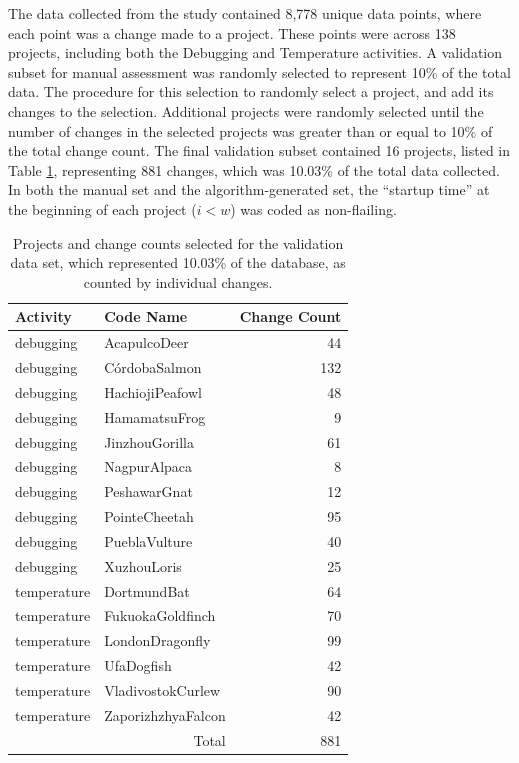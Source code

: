 The data collected from the study contained 8,778 unique data points, where each point was a change made to a project. These points were across 138 projects, including both the Debugging and Temperature activities. A validation subset for manual assessment was randomly selected to represent 10\% of the total data. The procedure for this selection to randomly select a project, and add its changes to the selection. Additional projects were randomly selected until the number of changes in the selected projects was greater than or equal to 10\% of the total change count. The final validation subset contained 16 projects, listed in Table \ref{tab:selected-projects}, representing 881 changes, which was 10.03\% of the total data collected. In both the manual set and the algorithm-generated set, the ``startup time'' at the beginning of each project ($i < w$) was coded as non-flailing.

\begin{table}
\begin{centering}
\begin{tabular}{l l r}
	Activity & Code Name & Change Count \\ \hline
	debugging & AcapulcoDeer & 44\\
	debugging & CórdobaSalmon & 132\\
	debugging & HachiojiPeafowl & 48\\
	debugging & HamamatsuFrog & 9\\
	debugging & JinzhouGorilla & 61\\
	debugging & NagpurAlpaca & 8\\
	debugging & PeshawarGnat & 12\\
	debugging & PointeCheetah & 95\\
	debugging & PueblaVulture & 40\\
	debugging & XuzhouLoris & 25 \\
	temperature & DortmundBat & 64\\
	temperature & FukuokaGoldfinch & 70 \\
	temperature & LondonDragonfly & 99 \\
	temperature & UfaDogfish & 42\\
	temperature & VladivostokCurlew & 90 \\
	temperature & ZaporizhzhyaFalcon & 42 \\ \hline
	\multicolumn{2}{r}{Total} & 881
\end{tabular}
\caption[Projects and Change Counts Selected for the Validation Data Set]{Projects and change counts selected for the validation data set, which represented 10.03\% of the database, as counted by individual changes.}
\label{tab:selected-projects}
\end{centering}
\end{table}

